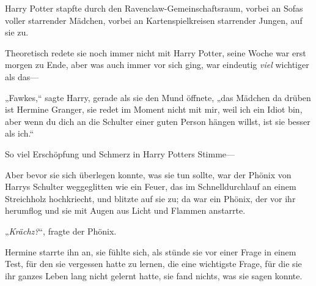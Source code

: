 Harry Potter stapfte durch den Ravenclaw-Gemeinschaftsraum, vorbei an Sofas voller starrender Mädchen, vorbei an Kartenspielkreisen starrender Jungen, auf sie zu.

Theoretisch redete sie noch immer nicht mit Harry Potter, seine Woche war erst morgen zu Ende, aber was auch immer vor sich ging, war eindeutig \emph{viel} wichtiger als das—

„Fawkes,“ sagte Harry, gerade als sie den Mund öffnete, „das Mädchen da drüben ist Hermine Granger, sie redet im Moment nicht mit mir, weil ich ein Idiot bin, aber wenn du dich an die Schulter einer guten Person hängen willst, ist sie besser als ich.“

So viel Erschöpfung und Schmerz in Harry Potters Stimme—

Aber bevor sie sich überlegen konnte, was sie tun sollte, war der Phönix von Harrys Schulter weggeglitten wie ein Feuer, das im Schnelldurchlauf an einem Streichholz hochkriecht, und blitzte auf sie zu; da war ein Phönix, der vor ihr herumflog und sie mit Augen aus Licht und Flammen anstarrte.

„\emph{Krächz?}“, fragte der Phönix.

Hermine starrte ihn an, sie fühlte sich, als stünde sie vor einer Frage in einem Test, für den sie vergessen hatte zu lernen, die eine wichtigste Frage, für die sie ihr ganzes Leben lang nicht gelernt hatte, sie fand nichts, was sie sagen konnte.

